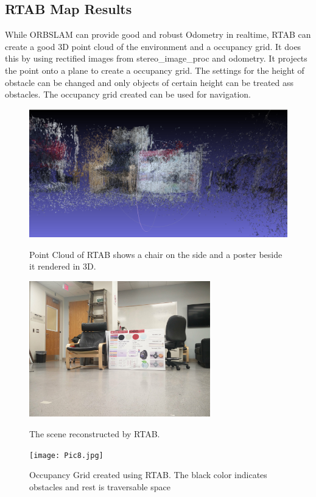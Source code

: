 \documentclass[10pt]{article}
\begin{document}
\subsection{RTAB Map Results}
	While ORBSLAM can provide good and robust Odometry in realtime, RTAB can create a good 3D point cloud of the environment and a occupancy grid. It does this by using rectified images from stereo\_image\_proc and odometry. It projects the point onto a plane to create a occupancy grid. The settings for the height of obstacle can be changed and only objects of certain height can be treated ass obstacles. The occupancy grid created can be used for navigation.
\begin{figure}[H]
\centering \includegraphics[width=1\textwidth]{PointCloud.png}\label{PointCloud of RTAB}
\caption{Point Cloud of RTAB shows a chair on the side and a poster beside it rendered in 3D.}
\end{figure}
\begin{figure}[H]
\centering \includegraphics[width=0.7\textwidth]{chair.jpg}\label{Point Cloud Image}
\caption{The scene reconstructed by RTAB.}
\end{figure}
\begin{figure}[H]
\centering \texttt{[image: Pic8.jpg]}\label{Occupancy Grid}
\caption{Occupancy Grid created using RTAB. The black color indicates obstacles and rest is traversable space}
\end{figure}
\end{document}
